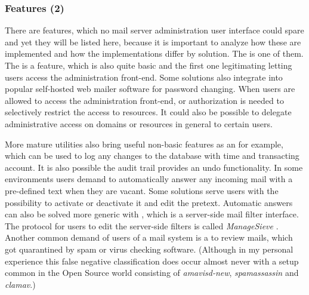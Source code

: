 \documentclass[12pt,a4paper]{scrartcl}
\begin{document}
			\subsubsection{Features (2)}
				There are features, which no mail server administration user
				interface could spare and yet they will be listed here, because
				it is important to analyze how these are implemented and how
				the implementations differ by solution. The  is one of them. The
				 is a feature,
				which is also quite basic and the first one legitimating
				letting users access the administration front-end. Some
				solutions also integrate into popular self-hosted web mailer
				software for password changing. When users are allowed to
				access the administration front-end, 
				or authorization is needed to selectively restrict the access
				to resources. It could also be possible to delegate
				administrative access on domains or resources in general to
				certain users.

				More mature utilities also bring useful non-basic features as
				an  for example, which can be used to
				log any changes to the database with time and transacting
				account. It is also possible the audit trail provides an undo
				functionality. In some environments users demand  to automatically answer any incoming mail with
				a pre-defined text when they are vacant. Some solutions serve
				users with the possibility to activate or deactivate it and
				edit the pretext. Automatic answers can also be solved more
				generic with  \cite{sieve}, which is a
				server-side mail filter interface. The protocol for users to
				edit the server-side filters is called \emph{ManageSieve}
				\cite{managesieve}. Another common demand of users of a mail
				system is a  to review mails, which
				got quarantined by spam or virus checking software. (Although
				in my personal experience this false negative classification
				does occur almost never with a setup common in the Open Source
				world consisting of \emph{amavisd-new}, \emph{spamassassin} and
				\emph{clamav}.)
\end{document}
